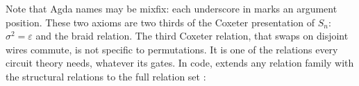 \noindent Note that Agda names may be mixfix: each
underscore in  marks an argument position.
These two axioms are two thirds of the Coxeter presentation
of $S_n$: $\sigma^2 = \varepsilon$ and the braid relation.  
The third Coxeter relation, that swaps on disjoint wires commute, is not specific
to permutations. It is one of the relations every circuit theory
needs, whatever its gates.  In code,  extends any
relation family with the structural relations to the full relation set
:

\begin{code}%
\>[0]\AgdaSpace{}%
\AgdaSpace{}%
\AgdaSymbol{:}\AgdaSpace{}%
\AgdaSymbol{(}\AgdaSpace{}%
\AgdaSymbol{:}\AgdaSpace{}%
\AgdaSymbol{)}\AgdaSpace{}%
\AgdaSpace{}%
\AgdaSpace{}%
\AgdaSpace{}%
\<%
\\
\>[0][@{}l@{\AgdaIndent{0}}]%
\>[2]%
\>[8]\AgdaSymbol{:}\AgdaSpace{}%
\AgdaSpace{}%
\AgdaSpace{}%
\AgdaSpace{}%
\AgdaOperator{\AgdaDatatype{===}}\AgdaSpace{}%
\AgdaSpace{}%
\AgdaSpace{}%
\AgdaSpace{}%
\AgdaSpace{}%
\AgdaSpace{}%
\AgdaOperator{\AgdaDatatype{===}}\AgdaSpace{}%
\<%
\\
%
\>[2]\AgdaSpace{}%
\AgdaSymbol{:}\AgdaSpace{}%
\AgdaSpace{}%
\AgdaSpace{}%
\AgdaSpace{}%
\AgdaOperator{\AgdaDatatype{===}}\AgdaSpace{}%
\AgdaSpace{}%
\AgdaSpace{}%
\AgdaSymbol{(}\AgdaSpace{}%
\AgdaSymbol{)}\AgdaSpace{}%
\AgdaSpace{}%
\AgdaSpace{}%
\AgdaSpace{}%
\AgdaOperator{\AgdaDatatype{===}}\AgdaSpace{}%
\AgdaSpace{}%
\<%
\\
%
\>[2]\AgdaSpace{}%
\AgdaSymbol{:}\AgdaSpace{}%
\AgdaSymbol{(}\AgdaSpace{}%
\AgdaSymbol{:}\AgdaSpace{}%
\AgdaSpace{}%
\AgdaSymbol{)}\AgdaSpace{}%
\AgdaSymbol{(}\AgdaSpace{}%

\end{code}
